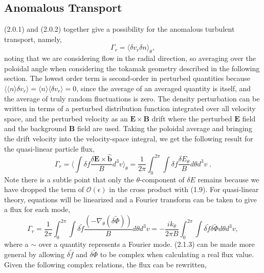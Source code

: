 \documentclass[12pt]{article}
\numberwithin{equation}{subsection}
\begin{document}
\subsection{Anomalous Transport}
   \quad (2.0.1) and (2.0.2) together give a possibility for the anomalous turbulent transport, namely,
   \begin{equation}
      \Gamma_r = \langle\delta v_r \delta n\rangle_\theta,
   \end{equation}
noting that we are considering flow in the radial direction, so averaging over the poloidal angle when considering the tokamak
geometry described in the following section. The lowest order term is second-order in perturbed quantities because
$\langle \langle n \rangle \delta v_r \rangle = \langle n \rangle \langle \delta v_r \rangle = 0$, since the average of an averaged
quantity is itself, and the average of truly random fluctuations is zero. The density perturbation can be written in terms of a
perturbed distribution function integrated over all velocity space, and the perturbed velocity as an $\bm{E}\times\bm{B}$ drift
where the perturbed $\bm{E}$ field and the background $\bm{B}$ field are used. Taking the poloidal average and bringing the drift
velocity into the velocity-space integral, we get the following result for the quasi-linear particle flux, 
   \begin{equation}
      \Gamma_r = \langle\int\delta f \frac{\delta\bm{E}\times\bm{\hat{b}}}{B} d^{3}v\rangle_\theta
               = \frac{1}{2\pi}\int_{0}^{2\pi} \int\delta f \frac{\delta E_\theta}{B}d\theta d^{3}v \;.
   \end{equation}
Note there is a subtle point that only the $\theta$-component of $\delta E$ remains because we have dropped the term of
$\mathcal{O}(\epsilon)$ in the cross product with (1.9). For quasi-linear theory, equations will be linearized
and a Fourier transform can be taken to give a flux for each mode,
   \begin{equation}
      \Gamma_r = \frac{1}{2\pi}\int_{0}^{2\pi} \int\delta\widetilde{f}
                    \frac{(-\nabla_\theta(\delta\widetilde{\Phi}))}{B}d\theta d^{3}v
               = -\frac{ik_\theta}{2\pi B}\int_{0}^{2\pi}\int\delta\widetilde{f}
                    \delta\widetilde{\Phi}d\theta d^{3}v,
   \end{equation}
where a $\sim$ over a quantity represents a Fourier mode. (2.1.3) can be made more general by allowing $\delta\widetilde{f}$ and $\delta\widetilde{\Phi}$
to be complex when calculating a real flux value. Given the following complex relations, the flux can be rewritten,
\end{document}
